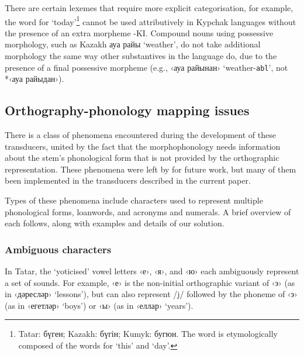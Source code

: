 \documentclass[a4paper,11pt,twocolumn]{article}
\newcommand{\tags}[1]{\texttt{#1}}
\begin{document}
There are certain lexemes that require more explicit categorisation, for example, the word 
for `today'\footnote{Tatar: бүген; Kazakh: бүгін; Kumyk: бугюн. The word is etymologically composed of the words for `this' and `day'.} 
cannot be used attributively in Kypchak languages without the presence of an extra morpheme -KI. Compound nouns
using possessive morphology, such as Kazakh ауа райы `weather', do not take additional morphology the same way other substantives in the language do, due to the presence of a final possessive morpheme (e.g., ‹ауа райынан› `weather-\tags{abl}', not *‹ауа райыдан›). %


\subsection{Orthography-phonology mapping issues}

There is a class of phenomena encountered during the development of these transducers, united by the fact that the morphophonology needs information about the stem's phonological form that is not provided by the orthographic representation.  These phenomena were left by \citet{washington2012} for future work, but many of them been implemented in the transducers described in the current paper.

Types of these phenomena include characters used to represent multiple phonological forms, loanwords, and acronyms and numerals.  A brief overview of each follows, along with examples and details of our solution.

\subsubsection{Ambiguous characters}
In Tatar, the `yoticised' vowel letters ‹е›, ‹я›, and ‹ю› each ambiguously represent a set of sounds.  For example, ‹е› is the non-initial orthographic variant of ‹э› (as in ‹дәресләр› `lessons'), but can also represent /j/ followed by the phoneme of ‹э› (as in ‹егетләр› `boys') or ‹ы› (as in ‹еллар› `years').
\end{document}
